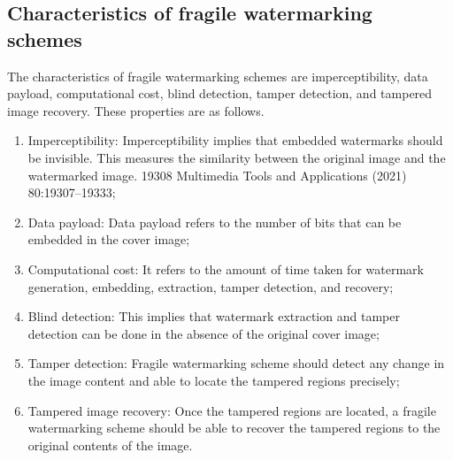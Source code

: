 \documentclass[draft, {\secondLanguage}, english]{volcanica-template}
\begin{document}
\subsection{Characteristics of fragile watermarking schemes}
The characteristics of fragile watermarking schemes are imperceptibility, data payload, computational cost, blind detection, tamper detection, and tampered image recovery. These properties are as follows.
\begin{enumerate}
    \item Imperceptibility: Imperceptibility implies that embedded watermarks should be invisible. This measures the similarity between the original image and the watermarked image. 19308 Multimedia Tools and Applications (2021) 80:19307–19333;
    \item  Data payload: Data payload refers to the number of bits that can be embedded in the cover image;
    \item Computational cost: It refers to the amount of time taken for watermark generation, embedding, extraction, tamper detection, and recovery;
    \item  Blind detection: This implies that watermark extraction and tamper detection can be done in the absence of the original cover image;
    \item  Tamper detection: Fragile watermarking scheme should detect any change in the image content and able to locate the tampered regions precisely;
    \item Tampered image recovery: Once the tampered regions are located, a fragile watermarking scheme should be able to recover the tampered regions to the original contents of the image.
\end{enumerate}

\EndMatter
\end{document}
